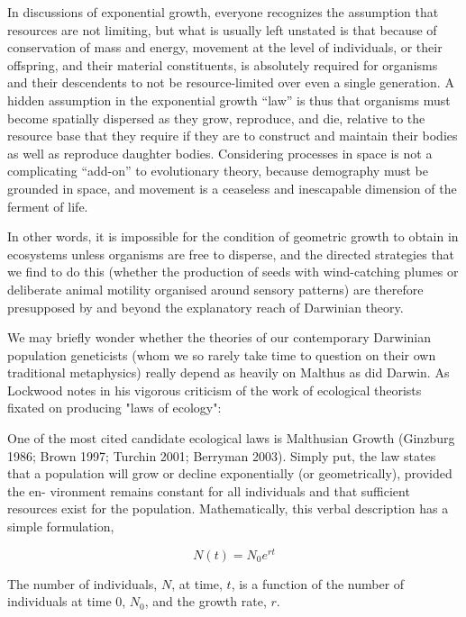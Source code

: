 \begin{longquote}
In discussions of exponential growth, everyone recognizes the assumption that resources are not limiting, but what is usually left unstated is that because of conservation
of mass and energy, movement at the level of individuals, or their offspring, and their
material constituents, is absolutely required for organisms and their descendents to not
be resource-limited over even a single generation. A hidden assumption in the exponential growth “law” is thus that organisms must become spatially dispersed as they grow,
reproduce, and die, relative to the resource base that they require if they are to construct
and maintain their bodies as well as reproduce daughter bodies. Considering processes
in space is not a complicating “add-on” to evolutionary theory, because demography
must be grounded in space, and movement is a ceaseless and inescapable dimension of
the ferment of life.
\cite{Holt2009}
\end{longquote}

In other words, it is impossible for the condition of geometric growth to obtain in ecosystems unless organisms are free to disperse, and the directed strategies that we find to do this (whether the production of seeds with wind-catching plumes or deliberate animal motility organised around sensory patterns) are therefore presupposed by and beyond the explanatory reach of Darwinian theory.

We may briefly wonder whether the theories of our contemporary Darwinian population geneticists (whom we so rarely take time to question on their own traditional metaphysics) really depend as heavily on Malthus as did Darwin. As Lockwood notes in his vigorous criticism of the work of ecological theorists fixated on producing "laws of ecology":

\begin{longquote}
One of the most cited candidate ecological laws is Malthusian Growth (Ginzburg
1986; Brown 1997; Turchin 2001; Berryman 2003). Simply put, the law states that
a population will grow or decline exponentially (or geometrically), provided the en-
vironment remains constant for all individuals and that sufficient resources exist for
the population. Mathematically, this verbal description has a simple formulation,

\begin{equation}
N(t) = N_0e^{rt}
\end{equation}

The number of individuals, $N$, at time, $t$, is a function of the number of individuals at time 0, $N_0$, and the growth rate, $r$.
\cite{Lockwood2008}
\end{longquote}

